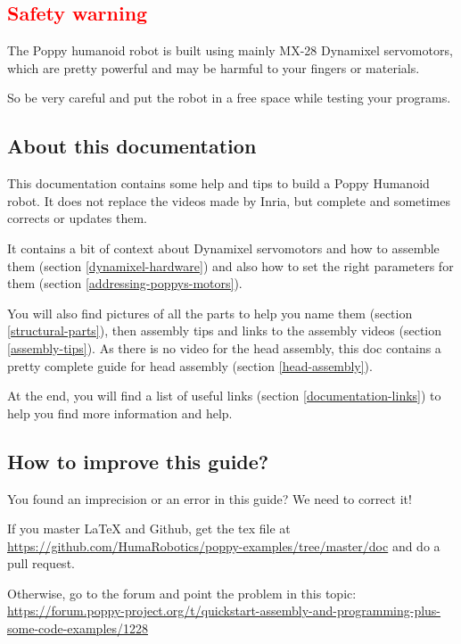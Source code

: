 \documentclass[includefoot]{article}
\begin{document}
\subsection{\textcolor{red}{Safety warning}}

The Poppy humanoid robot is built using mainly MX-28 Dynamixel servomotors, which are pretty powerful and may be harmful to your fingers or materials.

So be very careful and put the robot in a free space while testing your programs.

\subsection{About this documentation}

This documentation contains some help and tips to build a Poppy Humanoid robot. It does not replace the videos made by Inria, but complete and sometimes corrects or updates them.

It contains a bit of context about Dynamixel servomotors and how to assemble them (section \ref{dynamixel-hardware}) and also how to set the right parameters for them (section \ref{addressing-poppys-motors}).

You will also find pictures of all the parts to help you name them (section \ref{structural-parts}), then assembly tips and links to the assembly videos (section \ref{assembly-tips}). As there is no video for the head assembly, this doc contains a pretty complete guide for head assembly (section \ref{head-assembly}).

At the end, you will find a list of useful links (section \ref{documentation-links}) to help you find more information and help.

\subsection{How to improve this guide?}

You found an imprecision or an error in this guide? We need to correct it!

If you master LaTeX and Github, get the tex file at \href{https://github.com/HumaRobotics/poppy-examples/tree/master/doc}{https://github.com/HumaRobotics/poppy-examples/tree/master/doc} and do a pull request.

Otherwise, go to the forum and point the problem in this topic: \href{https://forum.poppy-project.org/t/quickstart-assembly-and-programming-plus-some-code-examples/1228}{https://forum.poppy-project.org/t/quickstart-assembly-and-programming-plus-some-code-examples/1228}
\end{document}
